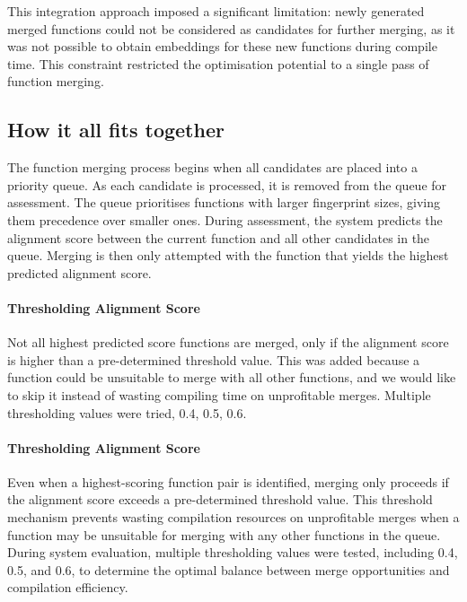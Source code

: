 This integration approach imposed a significant limitation: newly generated merged functions could not be considered as candidates for further merging, as it was not possible to obtain embeddings for these new functions during compile time. This constraint restricted the optimisation potential to a single pass of function merging.

\subsection{How it all fits together}
The function merging process begins when all candidates are placed into a priority queue. As each candidate is processed, it is removed from the queue for assessment. The queue prioritises functions with larger fingerprint sizes, giving them precedence over smaller ones. During assessment, the system predicts the alignment score between the current function and all other candidates in the queue. Merging is then only attempted with the function that yields the highest predicted alignment score.

\paragraph{Thresholding Alignment Score} Not all highest predicted score functions are merged, only if the alignment score is higher than a pre-determined threshold value. This was added because a function could be unsuitable to merge with all other functions, and we would like to skip it instead of wasting compiling time on unprofitable merges. Multiple thresholding values were tried, 0.4, 0.5, 0.6.

\paragraph{Thresholding Alignment Score} Even when a highest-scoring function pair is identified, merging only proceeds if the alignment score exceeds a pre-determined threshold value. This threshold mechanism prevents wasting compilation resources on unprofitable merges when a function may be unsuitable for merging with any other functions in the queue. During system evaluation, multiple thresholding values were tested, including 0.4, 0.5, and 0.6, to determine the optimal balance between merge opportunities and compilation efficiency.


